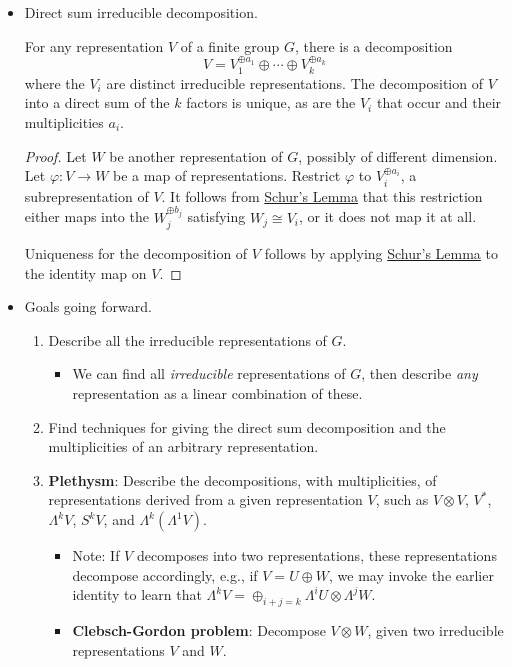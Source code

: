\documentclass[../notes.tex]{subfiles}
\begin{document}
\begin{itemize}
\begin{FHlemma}
\begin{proof}
        \end{proof}
    \end{FHlemma}
    \item Direct sum irreducible decomposition.
    \begin{FHproposition}\label{prp:completeReducibility}
        For any representation $V$ of a finite group $G$, there is a decomposition
        \begin{equation*}
            V = V_1^{\oplus a_1}\oplus\cdots\oplus V_k^{\oplus a_k}
        \end{equation*}
        where the $V_i$ are distinct irreducible representations. The decomposition of $V$ into a direct sum of the $k$ factors is unique, as are the $V_i$ that occur and their multiplicities $a_i$.
        \begin{proof}
            Let $W$ be another representation of $G$, possibly of different dimension. Let $\varphi:V\to W$ be a map of representations. Restrict $\varphi$ to $V_i^{\oplus a_i}$, a subrepresentation of $V$. It follows from \hyperref[lem:Schur]{Schur's Lemma} that this restriction either maps into the $W_j^{\oplus b_j}$ satisfying $W_j\cong V_i$, or it does not map it at all.\par
            Uniqueness for the decomposition of $V$ follows by applying \hyperref[lem:Schur]{Schur's Lemma} to the identity map on $V$.
        \end{proof}
    \end{FHproposition}
    \item Goals going forward.
    \begin{enumerate}
        \item Describe all the irreducible representations of $G$.
        \begin{itemize}
            \item We can find all \emph{irreducible} representations of $G$, then describe \emph{any} representation as a linear combination of these.
        \end{itemize}
        \item Find techniques for giving the direct sum decomposition and the multiplicities of an arbitrary representation.
        \item \textbf{Plethysm}: Describe the decompositions, with multiplicities, of representations derived from a given representation $V$, such as $V\otimes V$, $V^*$, $\Lambda^kV$, $S^kV$, and $\Lambda^k(\Lambda^1V)$.
        \begin{itemize}
            \item Note: If $V$ decomposes into two representations, these representations decompose accordingly, e.g., if $V=U\oplus W$, we may invoke the earlier identity to learn that $\Lambda^kV=\oplus_{i+j=k}\Lambda^iU\otimes\Lambda^jW$.
            \item \textbf{Clebsch-Gordon problem}: Decompose $V\otimes W$, given two irreducible representations $V$ and $W$.
        \end{itemize}
    \end{enumerate}
\end{itemize}
\end{document}
